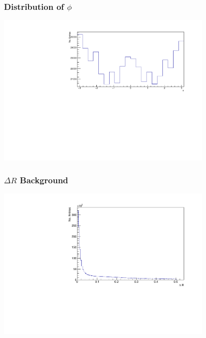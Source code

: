 \documentclass{beamer}
\begin{document}
\begin{frame}
\frametitle{Distribution of $\phi$}
\includegraphics[width=0.8\textwidth]{phiwoghosts.pdf}
\end{frame}

\begin{frame}
\frametitle{$\Delta R$ Background}
\includegraphics[width=0.8\textwidth]{delR.pdf}
\end{frame}
\end{document}
